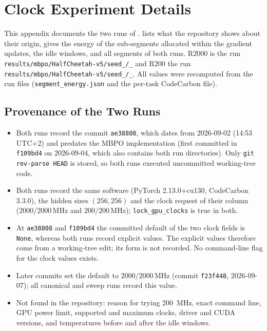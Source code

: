 \chapter{Clock Experiment Details}
\label{app:clock-details}

This appendix documents the two runs of .
 lists what the repository shows about their origin,  gives the energy of the sub-segments allocated within the gradient updates,  the idle windows, and  all segments of both runs.
R2000 is the run \texttt{results/\allowbreak mbpo/\allowbreak HalfCheetah-v5/\allowbreak seed\_/\_} and R200 the run \texttt{results/\allowbreak mbpo/\allowbreak HalfCheetah-v5/\allowbreak seed\_/\_}.
All values were recomputed from the run files (\texttt{segment\_\allowbreak energy.json} and the per-task CodeCarbon file).

\section{Provenance of the Two Runs}
\label{app:clock-provenance}

\begin{itemize}
  \item Both runs record the commit \texttt{ae38808}, which dates from 2026-09-02 (14:53 UTC+2) and predates the MBPO implementation (first committed in \texttt{f109bd4} on 2026-09-04, which also contains both run directories). Only \texttt{git rev-parse HEAD} is stored, so both runs executed uncommitted working-tree code.
  \item Both runs record the same software (PyTorch 2.13.0+cu130, CodeCarbon 3.3.0), the hidden sizes $(256,256)$ and the clock request of their column (\num{2000}/\num{2000}\,MHz and \num{200}/\num{200}\,MHz); \texttt{lock\_\allowbreak gpu\_\allowbreak clocks} is true in both.
  \item At \texttt{ae38808} and \texttt{f109bd4} the committed default of the two clock fields is \texttt{None}, whereas both runs record explicit values. The explicit values therefore come from a working-tree edit; its form is not recorded. No command-line flag for the clock values exists.
  \item Later commits set the default to $2000/2000$\,MHz (commit \texttt{f23f448}, 2026-09-07); all canonical and sweep runs record this value.
  \item Not found in the repository: reason for trying \SI{200}{\mega\hertz}, exact command line, GPU power limit, supported and maximum clocks, driver and CUDA versions, and temperatures before and after the idle windows.
\end{itemize}

